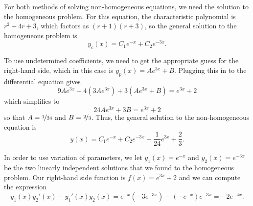 \begin{exampleSol}
For both methods of solving non-homogeneous equations, we need the solution to the homogeneous problem. For this equation, the characteristic polynomial is $r^2 + 4r + 3$, which factors as $(r+1)(r+3)$, so the general solution to the homogeneous problem is
\begin{equation*}
y_c(x) = C_1 e^{-x} + C_2e^{-3x}.
\end{equation*}

To use undetermined coefficients, we need to get the appropriate guess for the right-hand side, which in this case is $y_p(x) = Ae^{3x} + B$. Plugging this in to the differential equation gives
\begin{equation*}
9Ae^{3x} + 4(3Ae^{3x}) + 3(Ae^{3x} + B) = e^{3x} + 2
\end{equation*}
which simplifies to
\begin{equation*}
24Ae^{3x} + 3B = e^{3x} + 2
\end{equation*}
so that $A = \nicefrac{1}{24}$ and $B = \nicefrac{2}{3}$. Thus, the general solution to the non-homogeneous equation is
\begin{equation*}
y(x) = C_1e^{-x} + C_2e^{-3x} + \frac{1}{24}e^{3x} + \frac{2}{3}.
\end{equation*}

In order to use variation of parameters, we let $y_1(x) = e^{-x}$ and $y_2(x) = e^{-3x}$ be the two linearly independent solutions that we found to the homogeneous problem. Our right-hand side function is $f(x) = e^{3x} + 2$ and we can compute the expression
\begin{equation*}
y_1(x)y_2'(x) - y_1'(x)y_2(x) = e^{-x}(-3e^{-3x}) - (-e^{-x})e^{-3x} = -2e^{-4x}.
\end{equation*}


\end{exampleSol}
